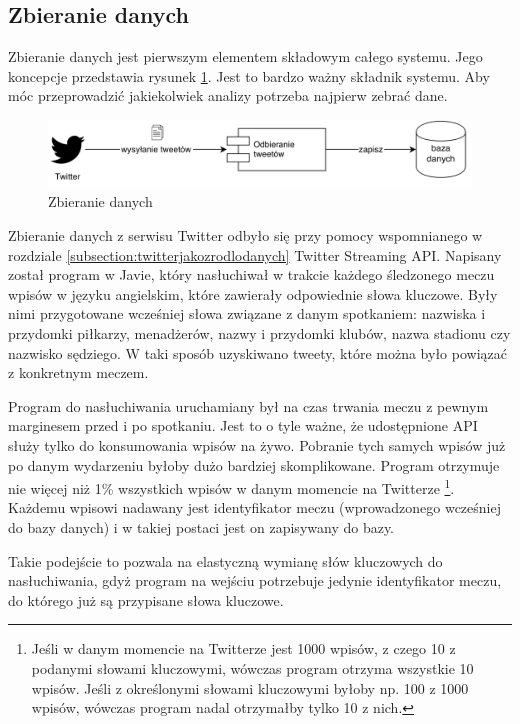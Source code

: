 \clearpage
\subsection{Zbieranie danych}
\label{subsection:zbieraniedanych}
Zbieranie danych jest pierwszym elementem składowym całego systemu.
Jego koncepcje przedstawia rysunek \ref{image:zbieranie-danych}.
Jest to bardzo ważny składnik systemu. Aby móc przeprowadzić jakiekolwiek
analizy potrzeba najpierw zebrać dane.

\begin{figure}[ht!]
\centering
\includegraphics[width=160mm]{img/zbieranie-danych.png}
\caption{Zbieranie danych}
\label{image:zbieranie-danych}
\end{figure}


Zbieranie danych z serwisu Twitter odbyło się przy pomocy wspomnianego w
rozdziale \ref{subsection:twitterjakozrodlodanych} Twitter Streaming API.
Napisany został program w Javie, który nasłuchiwał w trakcie każdego śledzonego
meczu wpisów w języku angielskim, które zawierały odpowiednie słowa kluczowe.
Były nimi przygotowane wcześniej słowa związane z danym spotkaniem: nazwiska i
przydomki piłkarzy, menadżerów, nazwy i przydomki klubów, nazwa stadionu czy
nazwisko sędziego. W taki sposób uzyskiwano tweety, które można było powiązać z
konkretnym meczem.

Program do nasłuchiwania uruchamiany był na czas trwania meczu z pewnym
marginesem przed i po spotkaniu. Jest to o tyle ważne, że udostępnione API służy
tylko do konsumowania wpisów na żywo. Pobranie tych samych wpisów już po danym
wydarzeniu byłoby dużo bardziej skomplikowane. Program otrzymuje nie więcej niż
1\% wszystkich wpisów w danym momencie na Twitterze \footnote{Jeśli w danym
momencie na Twitterze jest 1000 wpisów, z czego 10 z podanymi słowami
kluczowymi, wówczas program otrzyma wszystkie 10 wpisów. Jeśli z określonymi
słowami kluczowymi byłoby np. 100 z 1000 wpisów, wówczas program nadal
otrzymałby tylko 10 z nich.}. Każdemu wpisowi nadawany jest identyfikator meczu (wprowadzonego
wcześniej do bazy danych) i w takiej postaci jest on zapisywany do bazy.

Takie podejście to pozwala na elastyczną
wymianę słów kluczowych do nasłuchiwania, gdyż program na wejściu potrzebuje
jedynie identyfikator meczu, do którego już są przypisane słowa kluczowe.




